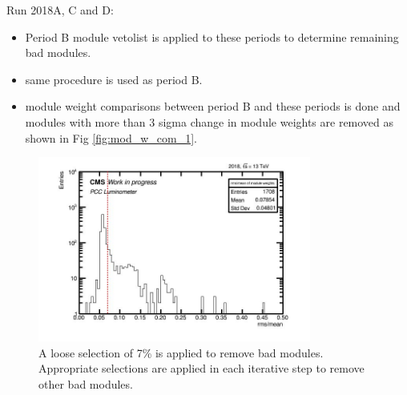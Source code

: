 Run 2018A, C and D:                                                                      
\begin{itemize}  

\item Period B module vetolist is applied to these periods to determine remaining bad modules.

\item same procedure is used as period B. 

\item module weight comparisons between period B and these periods is done and modules with more than 3 sigma change in module weights are removed as shown in %
  Fig \ref{fig:mod_w_com_1}.                                                                              
\end{itemize}



\begin{figure}[!htp]
\centering
\includegraphics[width=0.8\textwidth]{ashish_thesis/cut_selection_1.png}
\caption[First iteration for outlier modules]{%
   A loose selection of 7\% is applied to remove bad modules. Appropriate selections are applied in each iterative step to remove other bad modules.
}
\label{fig:outliermodules}
\end{figure}

